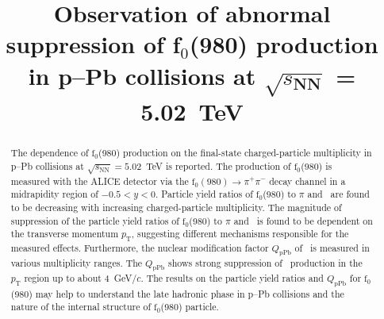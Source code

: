 \documentclass[ALICE,manyauthors]{cernphprep}
\begin{document}
\begin{titlepage}

\PHyear{}
\PHdate{\today}
%

\title{Observation of abnormal suppression of \textbf{f$_{0}$}(980) production \\in p--Pb collisions at $\sqrt{\textit{s}_{\mathbf{NN}}}$ = 5.02~TeV }

\ShortTitle{}   %


\begin{abstract}
The dependence of $\mathrm{f}_{0}$(980) production on the final-state charged-particle multiplicity in p--Pb collisions at $\sqrt{s_{\mathrm{NN}}} = 5.02$~TeV is reported. The production of $\mathrm{f}_{0}$(980) is measured with the ALICE detector via the $\mathrm{f}_0 (980) \rightarrow \pi^{+}\pi^{-}$ decay channel in a midrapidity region of $-0.5<y<0$. Particle yield ratios of $\mathrm{f}_{0}$(980) to $\pi$ and \kstar~are found to be decreasing with increasing charged-particle multiplicity. The magnitude of suppression of the particle yield ratios of $\mathrm{f}_{0}$(980) to $\pi$ and \kstar~is found to be dependent on the transverse momentum $p_{\mathrm{T}}$, suggesting different mechanisms responsible for the measured effects. Furthermore, the nuclear modification factor $Q_{\mbox{pPb}}$ of \fzero~is measured in various multiplicity ranges. The $Q_{\mbox{pPb}}$ shows strong suppression of \fzero~production in the  $p_{\mathrm{T}}$ region up to about 4~GeV/$c$. The results on the particle yield ratios and $Q_{\mbox{pPb}}$ for $\mathrm{f}_{0}$(980) may help to understand the late hadronic phase in p--Pb collisions and the nature of the internal structure of $\mathrm{f}_{0}$(980) particle.

\color{black}

\end{abstract}
 
\end{titlepage}

\setcounter{page}{2}





\end{document}
